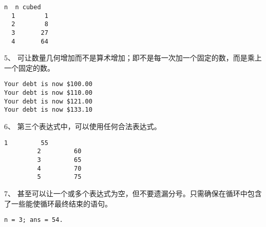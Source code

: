 \begin{frame}[fragile]
\begin{lstlisting}[backgroundcolor=\color{red!10}]
  n  n cubed
  1        1
  2        8
  3       27
  4       64
\end{lstlisting}
\end{frame}

\begin{frame}[fragile]
5、 可让数量几何增加而不是算术增加；即不是每一次加一个固定的数，而是乘上一个固定的数。

\end{frame}

\begin{frame}[fragile]
\begin{lstlisting}[backgroundcolor=\color{red!10}]
Your debt is now $100.00
Your debt is now $110.00
Your debt is now $121.00
Your debt is now $133.10
\end{lstlisting}
\end{frame}

\begin{frame}[fragile]
6、 第三个表达式中，可以使用任何合法表达式。

\end{frame}

\begin{frame}[fragile]
\begin{lstlisting}[backgroundcolor=\color{red!10}]
         1         55
         2         60
         3         65
         4         70
         5         75
\end{lstlisting}
\end{frame}

\begin{frame}[fragile]
7、 甚至可以让一个或多个表达式为空，但不要遗漏分号。只需确保在循环中包含了一些能使循环最终结束的语句。
\end{frame}

\begin{frame}[fragile]
  
\end{frame}

\begin{frame}[fragile]

\begin{lstlisting}[backgroundcolor=\color{red!10}]
n = 3; ans = 54.
\end{lstlisting}
\end{frame}

